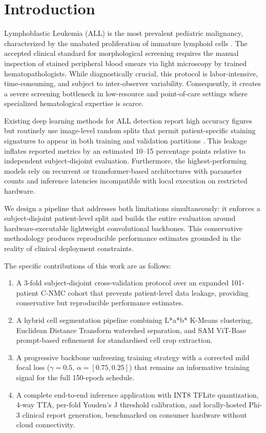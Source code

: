 \documentclass[journal,twoside,web]{ieeecolor}
\begin{document}
\section{Introduction}
\label{sec:introduction}
 Lymphoblastic Leukemia (ALL) is the most prevalent pediatric malignancy, characterized by the unabated proliferation of immature lymphoid cells \cite{b_bray2018}. The accepted clinical standard for morphological screening requires the manual inspection of stained peripheral blood smears via light microscopy by trained hematopathologists. While diagnostically crucial, this protocol is labor-intensive, time-consuming, and subject to inter-observer variability. Consequently, it creates a severe screening bottleneck in low-resource and point-of-care settings where specialized hematological expertise is scarce.

Existing deep learning methods for ALL detection report high accuracy figures but routinely use image-level random splits that permit patient-specific staining signatures to appear in both training and validation partitions \cite{b3, b4, b7, b10}. This leakage inflates reported metrics by an estimated 10--15 percentage points relative to independent subject-disjoint evaluation. Furthermore, the highest-performing models rely on recurrent or transformer-based architectures with parameter counts and inference latencies incompatible with local execution on restricted hardware.

We design a pipeline that addresses both limitations simultaneously: it enforces a subject-disjoint patient-level split and builds the entire evaluation around hardware-executable lightweight convolutional backbones. This conservative methodology produces reproducible performance estimates grounded in the reality of clinical deployment constraints.

The specific contributions of this work are as follows:
\begin{enumerate}
\item A 3-fold subject-disjoint cross-validation protocol over an expanded 101-patient C-NMC cohort that prevents patient-level data leakage, providing conservative but reproducible performance estimates.
\item A hybrid cell segmentation pipeline combining L*a*b* K-Means clustering, Euclidean Distance Transform watershed separation, and SAM ViT-Base prompt-based refinement for standardised cell crop extraction.
\item A progressive backbone unfreezing training strategy with a corrected mild focal loss ($\gamma=0.5$, $\alpha=[0.75, 0.25]$) that remains an informative training signal for the full 150-epoch schedule.
\item A complete end-to-end inference application with INT8 TFLite quantization, 4-way TTA, per-fold Youden's J threshold calibration, and locally-hosted Phi-3 clinical report generation, benchmarked on consumer hardware without cloud connectivity.
\end{enumerate}
\end{document}
